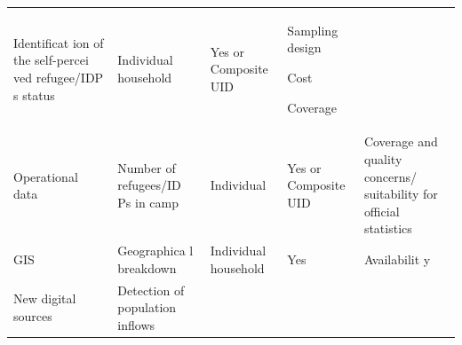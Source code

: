 \documentclass[
]{article}
\begin{document}
\begin{longtable}[]{@{}lllll@{}}
\begin{minipage}[t]{0.17\columnwidth}
Identificat
ion
of the
self-percei
ved
refugee/IDP
s
status\strut
\end{minipage} & \begin{minipage}[t]{0.17\columnwidth}\raggedright
Individual
household\strut
\end{minipage} & \begin{minipage}[t]{0.17\columnwidth}\raggedright
Yes or
Composite
UID\strut
\end{minipage} & \begin{minipage}[t]{0.17\columnwidth}\raggedright
Sampling
design

Cost

Coverage\strut
\end{minipage}\tabularnewline
\begin{minipage}[t]{0.17\columnwidth}\raggedright
Operational
data\strut
\end{minipage} & \begin{minipage}[t]{0.17\columnwidth}\raggedright
Number of
refugees/ID
Ps
in camp\strut
\end{minipage} & \begin{minipage}[t]{0.17\columnwidth}\raggedright
Individual\strut
\end{minipage} & \begin{minipage}[t]{0.17\columnwidth}\raggedright
Yes or
Composite
UID\strut
\end{minipage} & \begin{minipage}[t]{0.17\columnwidth}\raggedright
Coverage
and quality
concerns/
suitability
for
official
statistics\strut
\end{minipage}\tabularnewline
\begin{minipage}[t]{0.17\columnwidth}\raggedright
GIS\strut
\end{minipage} & \begin{minipage}[t]{0.17\columnwidth}\raggedright
Geographica
l
breakdown\strut
\end{minipage} & \begin{minipage}[t]{0.17\columnwidth}\raggedright
Individual
household\strut
\end{minipage} & \begin{minipage}[t]{0.17\columnwidth}\raggedright
Yes\strut
\end{minipage} & \begin{minipage}[t]{0.17\columnwidth}\raggedright
Availabilit
y\strut
\end{minipage}\tabularnewline
\begin{minipage}[t]{0.17\columnwidth}\raggedright
New digital
sources\strut
\end{minipage} & \begin{minipage}[t]{0.17\columnwidth}\raggedright
Detection
of
population
inflows


\end{minipage}
\end{longtable}
\end{document}
